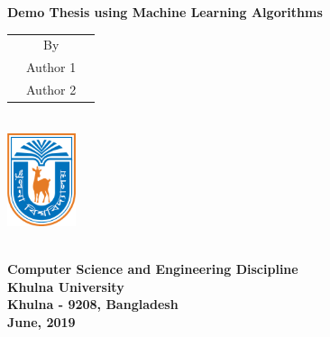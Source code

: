 \thispagestyle{empty}
\begin{center}
\Large \textbf{Demo Thesis using Machine Learning Algorithms\\}
\normalsize
\vspace{84pt}

\large
\begin{tabular}{ccc}
&By&\\
&Author 1&\\
&Author 2&\\
\end{tabular}\\

\vspace{84pt}
\includegraphics[width=0.15\textwidth]{images/logo.png}

\vspace{84pt}
\hspace{5cm} \makebox[6in]{\hrulefill}\\
\large
\textbf{Computer Science and Engineering Discipline}\\
\textbf{Khulna University} \\
\textbf{Khulna - 9208, Bangladesh}\\
\vspace{24pt}
\textbf{June, 2019}
\end{center}
